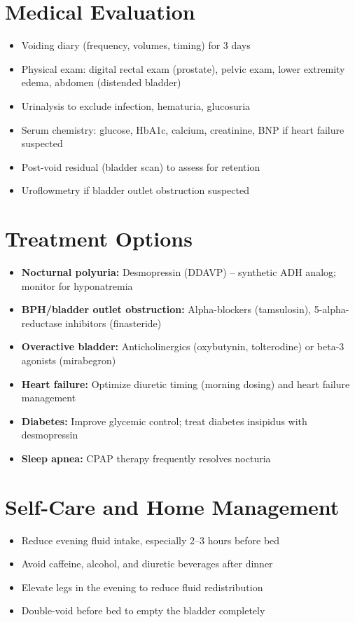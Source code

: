 \section*{Medical Evaluation}
\begin{itemize}
  \item Voiding diary (frequency, volumes, timing) for 3 days
  \item Physical exam: digital rectal exam (prostate), pelvic exam, lower extremity edema, abdomen (distended bladder)
  \item Urinalysis to exclude infection, hematuria, glucosuria
  \item Serum chemistry: glucose, HbA1c, calcium, creatinine, BNP if heart failure suspected
  \item Post-void residual (bladder scan) to assess for retention
  \item Uroflowmetry if bladder outlet obstruction suspected
\end{itemize}

\section*{Treatment Options}
\begin{itemize}
  \item \textbf{Nocturnal polyuria:} Desmopressin (DDAVP) -- synthetic ADH analog; monitor for hyponatremia
  \item \textbf{BPH/bladder outlet obstruction:} Alpha-blockers (tamsulosin), 5-alpha-reductase inhibitors (finasteride)
  \item \textbf{Overactive bladder:} Anticholinergics (oxybutynin, tolterodine) or beta-3 agonists (mirabegron)
  \item \textbf{Heart failure:} Optimize diuretic timing (morning dosing) and heart failure management
  \item \textbf{Diabetes:} Improve glycemic control; treat diabetes insipidus with desmopressin
  \item \textbf{Sleep apnea:} CPAP therapy frequently resolves nocturia
\end{itemize}

\section*{Self-Care and Home Management}
\begin{itemize}
  \item Reduce evening fluid intake, especially 2--3 hours before bed
  \item Avoid caffeine, alcohol, and diuretic beverages after dinner
  \item Elevate legs in the evening to reduce fluid redistribution
  \item Double-void before bed to empty the bladder completely
\end{itemize}

